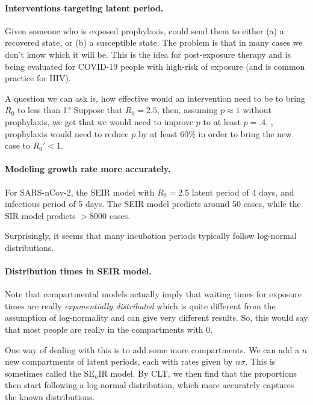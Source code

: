 \documentclass[12pt]{article}
\begin{document}
\paragraph{Interventions targeting latent period.} Given someone who is exposed prophylaxis, could send them to either (a) a recovered state, or (b) a susceptible state. The problem is that in many cases we don't know which it will be. This is the idea for post-exposure therapy and is being evaluated for COVID-19 people with high-risk of exposure (and is common practice for HIV).

A question we can ask is, how effective would an intervention need to be to bring $R_0$ to less than 1? Suppose that $R_0 = 2.5$, then, assuming $p \approx 1$ without prophylaxis, we get that we would need to improve $p$ to at least $p = .4$, \ie, prophylaxis would need to reduce $p$ by at least 60\% in order to bring the new case to $R_0' < 1$.

\paragraph{Modeling growth rate more accurately.} For SARS-nCov-2, the SEIR model with $R_0 = 2.5$ latent period of 4 days, and infectious period of 5 days. The SEIR model predicts around 50 cases, while the SIR model predicts $>8000$ cases.

Surprisingly, it seems that many incubation periods typically follow log-normal distributions.

\paragraph{Distribution times in SEIR model.} Note that compartmental models actually imply that waiting times for exposure times are really \emph{exponentially distributed} which is quite different from the assumption of log-normality and can give very different results. So, this would say that most people are really in the compartments with 0.

One way of dealing with this is to add some more compartments. We can add a $n$ new compartments of latent periods, each with rates given by $n \sigma$. This is sometimes called the SE$_n$IR model. By CLT, we then find that the proportions then start following a log-normal distribution, which more accurately captures the known distributions.
\end{document}
